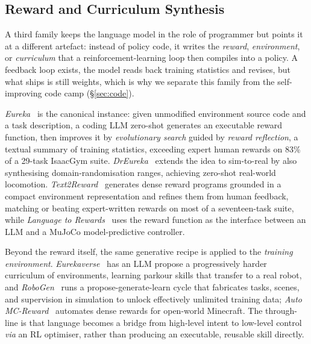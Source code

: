 \subsection{Reward and Curriculum Synthesis}
\label{sec:reward}

A third family keeps the language model in the role of programmer but points it at a
different artefact: instead of policy code, it writes the \emph{reward}, \emph{environment},
or \emph{curriculum} that a reinforcement-learning loop then compiles into a policy. A
feedback loop exists, the model reads back training statistics and revises, but what ships
is still weights, which is why we separate this family from the self-improving code camp
(\S\ref{sec:code}).

\emph{Eureka}~\citep{eureka} is the canonical instance: given unmodified environment source
code and a task description, a coding LLM zero-shot generates an executable reward function,
then improves it by \emph{evolutionary search} guided by \emph{reward reflection}, a textual
summary of training statistics, exceeding expert human rewards on 83\% of a 29-task IsaacGym
suite. \emph{DrEureka}~\citep{dreureka} extends the idea to sim-to-real by also synthesising
domain-randomisation ranges, achieving zero-shot real-world locomotion.
\emph{Text2Reward}~\citep{text2reward} generates dense reward programs grounded in a compact
environment representation and refines them from human feedback, matching or beating
expert-written rewards on most of a seventeen-task suite, while \emph{Language to
Rewards}~\citep{l2r} uses the reward function as the interface between an LLM and a MuJoCo
model-predictive controller.

Beyond the reward itself, the same generative recipe is applied to the \emph{training
environment}. \emph{Eurekaverse}~\citep{eurekaverse} has an LLM propose a progressively harder
curriculum of environments, learning parkour skills that transfer to a real robot, and
\emph{RoboGen}~\citep{robogen} runs a propose-generate-learn cycle that fabricates tasks,
scenes, and supervision in simulation to unlock effectively unlimited training data;
\emph{Auto MC-Reward}~\citep{automcreward} automates dense rewards for open-world Minecraft.
The through-line is that language becomes a bridge from high-level intent to low-level control
\emph{via} an RL optimiser, rather than producing an executable, reusable skill directly.
